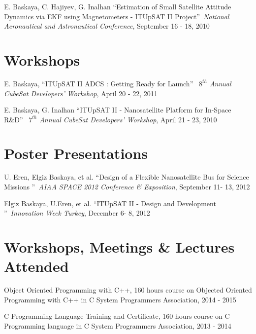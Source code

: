 \documentclass[margin,line]{res}
\begin{document}
\begin{resume}
E. Baskaya, C. Hajiyev, G. Inalhan \textquotedblleft Estimation of Small Satellite Attitude Dynamics via EKF using Magnetometers - ITUpSAT II Project\textquotedblright\ \emph{National Aeronautical and Astronautical Conference}, September 16 - 18, 2010
\vspace*{-.05in}


\section{\sc Workshops}
E. Baskaya, \textquotedblleft ITUpSAT II ADCS : Getting Ready for Launch\textquotedblright\ \emph{ $8^{th}$ Annual CubeSat Developers' Workshop}, April 20 - 22, 2011
\vspace*{-.05in}


E. Baskaya, G. Inalhan \textquotedblleft ITUpSAT II - Nanosatellite Platform for In-Space R\&D\textquotedblright\ \emph{ $7^{th}$ Annual CubeSat Developers' Workshop}, April 21 - 23, 2010
\vspace*{-.05in}

\section{\sc Poster Presentations}

U. Eren, Elgiz Baskaya, et al. \textquotedblleft Design of a Flexible Nanosatellite Bus for Science Missions \textquotedblright\ \emph{AIAA SPACE 2012 Conference \& Exposition}, September 11- 13, 2012

Elgiz Baskaya, U.Eren, et al. \textquotedblleft ITUpSAT II - Design and Development \textquotedblright\ \emph{Innovation Week Turkey}, December 6- 8, 2012

\section{\sc Workshops, Meetings \& Lectures Attended }
Object Oriented Programming with C++, 160 hours course on Objected Oriented Programming  with C++ in C System Programmers Association, 2014 - 2015
\vspace*{-.05in}

C Programming Language Training and Certificate, 160 hours course on C Programming language in C System Programmers Association, 2013 - 2014
\vspace*{-.05in}


\end{resume}
\end{document}
